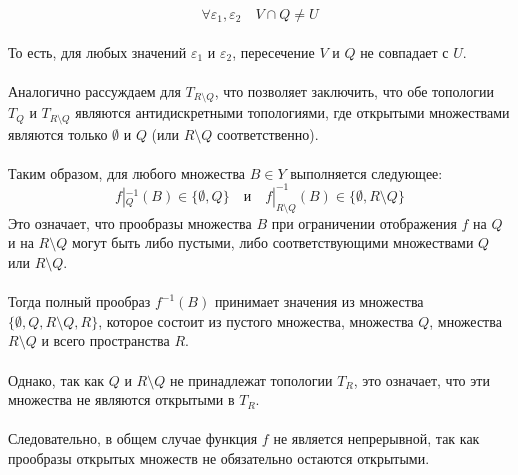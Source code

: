 \documentclass{article}
\begin{document}
        \[
        \forall \varepsilon_1, \varepsilon_2 \quad V \cap Q \neq U
        \]\\
        То есть, для любых значений \( \varepsilon_1 \) и \( \varepsilon_2 \), пересечение \( V \) и \( Q \) не совпадает с \( U \).\\ \\
        Аналогично рассуждаем для \( T_{R \setminus Q} \), что позволяет заключить, что обе топологии \( T_Q \) и \( T_{R \setminus Q} \) являются антидискретными топологиями, где открытыми множествами являются только \( \emptyset \) и \( Q \) (или \( R \setminus Q \) соответственно).\\ \\
        Таким образом, для любого множества \( B \in Y \) выполняется следующее:
        \[
        f|_{Q}^{-1}(B) \in \{\emptyset, Q\} \quad \text{и} \quad f|_{R \setminus Q}^{-1}(B) \in \{\emptyset, R \setminus Q\}
        \]
        Это означает, что прообразы множества \( B \) при ограничении отображения \( f \) на \( Q \) и на \( R \setminus Q \) могут быть либо пустыми, либо соответствующими множествами \( Q \) или \( R \setminus Q \).\\ \\
        Тогда полный прообраз \( f^{-1}(B) \) принимает значения из множества \(\{\emptyset, Q, R \setminus Q, R\}\), которое состоит из пустого множества, множества \( Q \), множества \( R \setminus Q \) и всего пространства \( R \).\\ \\
        Однако, так как \( Q \) и \( R \setminus Q \) не принадлежат топологии \( T_R \), это означает, что эти множества не являются открытыми в \( T_R \).\\ \\
        Следовательно, в общем случае функция \( f \) не является непрерывной, так как прообразы открытых множеств не обязательно остаются открытыми.
        
            
            
                
        

        
                
                               
                
\end{document}

